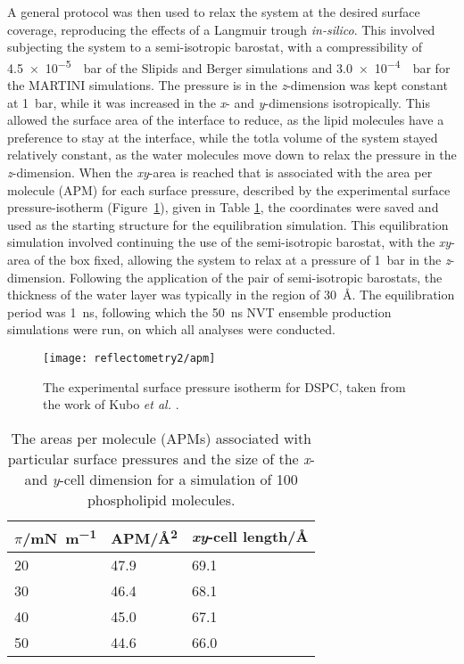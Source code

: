 A general protocol was then used to relax the system at the desired surface coverage, reproducing the effects of a Langmuir trough \emph{in-silico}.
This involved subjecting the system to a semi-isotropic barostat, with a compressibility of \SI{4.5e-5}{\per\bar} of the Slipids and Berger simulations and \SI{3.0e-4}{\per\bar} for the MARTINI simulations.
The pressure is in the \emph{z}-dimension was kept constant at \SI{1}{\bar}, while it was increased in the \emph{x}- and \emph{y}-dimensions isotropically.
This allowed the surface area of the interface to reduce, as the lipid molecules have a preference to stay at the interface, while the totla volume of the system stayed relatively constant, as the water molecules move down to relax the pressure in the \emph{z}-dimension.
When the \emph{xy}-area is reached that is associated with the area per molecule (APM) for each surface pressure, described by the experimental surface pressure-isotherm (Figure~\ref{fig:surfiso}), given in Table \ref{tab:apm}, the coordinates were saved and used as the starting structure for the equilibration simulation.
This equilibration simulation involved continuing the use of the semi-isotropic barostat, with the \emph{xy}-area of the box fixed, allowing the system to relax at a pressure of \SI{1}{\bar} in the \emph{z}-dimension.
Following the application of the pair of semi-isotropic barostats, the thickness of the water layer was typically in the region of \SI{30}{\angstrom}.
The equilibration period was \SI{1}{\nano\second}, following which the \SI{50}{\nano\second} NVT ensemble production simulations were run, on which all analyses were conducted.
%
\begin{figure}
    \centering
    \texttt{[image: reflectometry2/apm]}
    \caption{The experimental surface pressure isotherm for DSPC, taken from the work of Kubo \emph{et al.} \cite{kubo_phosphatidylcholine_2001}.}
    \label{fig:surfiso}
\end{figure}
%
%
\begin{table}
    \centering
    \small
    \caption{The areas per molecule (APMs) associated with particular surface pressures and the size of the \emph{x}- and \emph{y}-cell dimension for a simulation of 100 phospholipid molecules.}
    \label{tab:apm}
    \begin{tabular}{l | l l}
        \toprule
        $\pi$/\si{\milli\newton\per\meter} & APM/\si{\angstrom\squared} & \emph{xy}-cell length/\si{\angstrom} \\
        \midrule
        \num{20} & \num{47.9} & \num{69.1} \\
        \num{30} & \num{46.4} & \num{68.1} \\
        \num{40} & \num{45.0} & \num{67.1} \\
        \num{50} & \num{44.6} & \num{66.0} \\
        \bottomrule
    \end{tabular}
\end{table}
%
